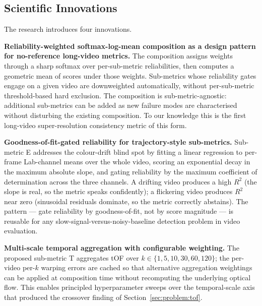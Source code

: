 \subsection{Scientific Innovations}

The research introduces four innovations.

\textbf{Reliability-weighted softmax-log-mean composition as a design pattern for
no-reference long-video metrics.} The composition assigns weights through a sharp softmax
over per-sub-metric reliabilities, then computes a geometric mean of scores under those
weights. Sub-metrics whose reliability gates engage on a given video are downweighted
automatically, without per-sub-metric threshold-based hard exclusion. The composition is
sub-metric-agnostic: additional sub-metrics can be added as new failure modes are
characterised without disturbing the existing composition. To our knowledge this is the
first long-video super-resolution consistency metric of this form.

\textbf{Goodness-of-fit-gated reliability for trajectory-style sub-metrics.} Sub-metric E
addresses the colour-drift blind spot by fitting a linear regression to per-frame
Lab-channel means over the whole video, scoring an exponential decay in the maximum
absolute slope, and gating reliability by the maximum coefficient of determination across
the three channels. A drifting video produces a high $R^2$ (the slope is real, so the
metric speaks confidently); a flickering video produces $R^2$ near zero (sinusoidal
residuals dominate, so the metric correctly abstains). The pattern --- gate reliability by
goodness-of-fit, not by score magnitude --- is reusable for any slow-signal-versus-noisy-baseline
detection problem in video evaluation.

\textbf{Multi-scale temporal aggregation with configurable weighting.} The proposed
sub-metric T aggregates tOF over $k \in \{1, 5, 10, 30, 60, 120\}$; the per-video per-$k$
warping errors are cached so that alternative aggregation weightings can be applied at
composition time without recomputing the underlying optical flow. This enables principled
hyperparameter sweeps over the temporal-scale axis that produced the crossover finding of
Section~\ref{sec:problem:tof}.


